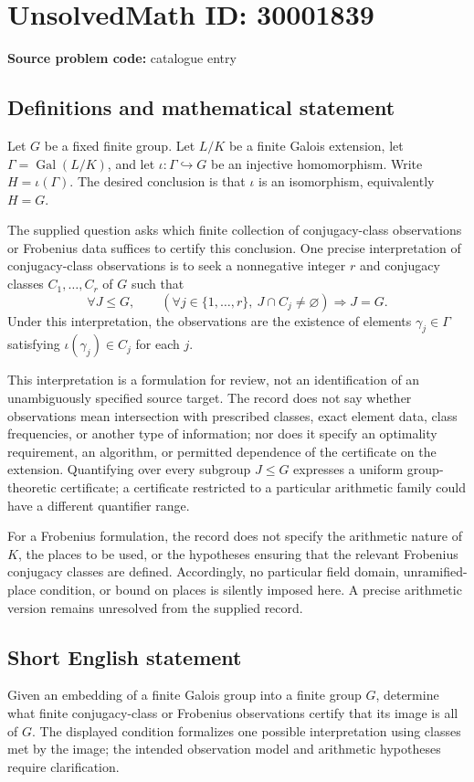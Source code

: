 \documentclass[11pt]{article}
\begin{document}
\section*{UnsolvedMath ID: 30001839}
\textbf{Source problem code:} catalogue entry
\subsection{Definitions and mathematical statement}
Let \(G\) be a fixed finite group. Let \(L/K\) be a finite Galois extension, let \(\Gamma=\operatorname{Gal}(L/K)\), and let \(\iota\colon\Gamma\hookrightarrow G\) be an injective homomorphism. Write \(H=\iota(\Gamma)\). The desired conclusion is that \(\iota\) is an isomorphism, equivalently \(H=G\).

The supplied question asks which finite collection of conjugacy-class observations or Frobenius data suffices to certify this conclusion. One precise interpretation of conjugacy-class observations is to seek a nonnegative integer \(r\) and conjugacy classes \(C_1,\ldots,C_r\) of \(G\) such that
\[
\forall J\leq G,\qquad
\left(\forall j\in\{1,\ldots,r\},\ J\cap C_j\ne\varnothing\right)
\Longrightarrow J=G.
\]
Under this interpretation, the observations are the existence of elements \(\gamma_j\in\Gamma\) satisfying \(\iota(\gamma_j)\in C_j\) for each \(j\).

This interpretation is a formulation for review, not an identification of an unambiguously specified source target. The record does not say whether observations mean intersection with prescribed classes, exact element data, class frequencies, or another type of information; nor does it specify an optimality requirement, an algorithm, or permitted dependence of the certificate on the extension. Quantifying over every subgroup \(J\leq G\) expresses a uniform group-theoretic certificate; a certificate restricted to a particular arithmetic family could have a different quantifier range.

For a Frobenius formulation, the record does not specify the arithmetic nature of \(K\), the places to be used, or the hypotheses ensuring that the relevant Frobenius conjugacy classes are defined. Accordingly, no particular field domain, unramified-place condition, or bound on places is silently imposed here. A precise arithmetic version remains unresolved from the supplied record.
\subsection{Short English statement}
Given an embedding of a finite Galois group into a finite group \(G\), determine what finite conjugacy-class or Frobenius observations certify that its image is all of \(G\). The displayed condition formalizes one possible interpretation using classes met by the image; the intended observation model and arithmetic hypotheses require clarification.
\end{document}
